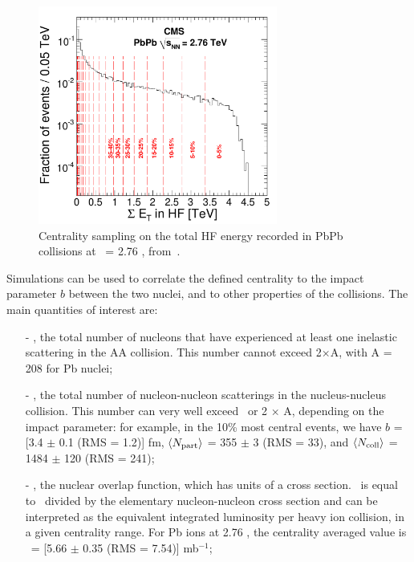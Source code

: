 \begin{figure}[!htb]
  \begin{center}
    \includegraphics[width=0.7\textwidth]{Chapters/xLHCMS/HIN_10_001_Fig1.pdf}
    \caption{Centrality sampling on the total HF energy recorded in
      PbPb collisions at \snn\ = 2.76 \TeV, from~\cite{pbpbmult}.} 
    \label{fig:hfet}
  \end{center}
\end{figure}




Simulations can be used to correlate the defined centrality to the
impact parameter $b$ between the two nuclei, and to other properties of the
collisions. The main quantities of interest are:

\begin{itemize}
\item[-] \Npart, the total number of nucleons that have experienced at
  least one inelastic scattering in the AA collision. This number
  cannot exceed 2$\times$A, with A = 208 for Pb nuclei;
\item[-] \Ncoll, the total number of nucleon-nucleon scatterings in
  the nucleus-nucleus collision. This number can very well exceed
  \Npart\ or 2 $\times$ A, depending on the impact parameter: for example, in the
  10\% most central events, we have $b$ = [3.4 $\pm$ 0.1 (RMS = 1.2)]
  fm, $\langle N_{\rm part} \rangle$ =  355 $\pm$ 3 (RMS = 33), and $\langle
  N_{\rm coll} \rangle$ =  1484 $\pm$ 120 (RMS = 241);
\item[-] \TAA, the nuclear overlap function, which has units of a
  cross section. \TAA\ is equal to \Ncoll\ divided by the elementary
  nucleon-nucleon cross section and can be interpreted as the
  equivalent integrated luminosity per heavy ion collision, in a given
  centrality range. For Pb ions at 2.76 \TeV, the centrality averaged
  value is \TAA\ = [5.66 $\pm$ 0.35 (RMS = 7.54)] mb$^{-1}$;
\end{itemize}


